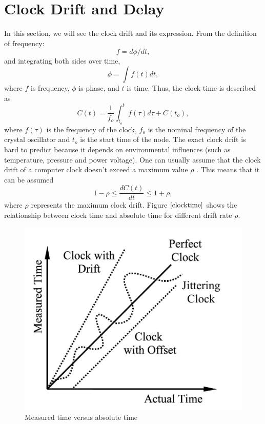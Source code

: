 \documentclass[a4paper,10pt]{report}
\begin{document}
\section{\textbf{Clock Drift and Delay}}
In this section, we will see the clock drift and its expression. From the definition of frequency:
\begin{equation}
f = d\phi/dt \label{freq_defn} ,
\end{equation}
and integrating both sides over time,
 \begin{equation}
\phi =\int f(t)dt ,
 \end{equation}
where $f$ is frequency, $\phi$ is phase, and $t$ is time.\newline
Thus, the clock time is described as
\begin{equation}
C(t) = \frac{1}{f_o}\int_{t_o}^{t} {f(\tau)d\tau} + C(t_o) ,
\label{clock}
\end{equation}
where $f(\tau)$ is the frequency of the clock, $f_o$ is the nominal frequency of the crystal oscillator and $t_o$ is the start time of
the node. The exact clock drift is hard to predict because it depends on environmental influences (such as temperature, pressure
and power voltage). One can usually assume that the clock drift of a computer clock doesn't exceed a maximum value $\rho$ . This means
that it can be assumed
\begin{equation}
1-\rho \leq \frac{dC(t)}{dt} \leq 1+\rho ,
\end{equation}
where $\rho$ represents the maximum clock drift. Figure $\ref{clocktime}$ shows the relationship between clock time and absolute time for different drift rate $\rho$.
\begin{figure}
\centering
\includegraphics[width=0.6 \textwidth]{actualvsmeasuredtime}
\caption{Measured time versus absolute time} \label{clocktime}
\end{figure}
\newline
\end{document}
